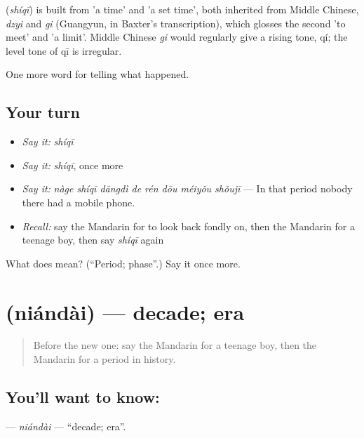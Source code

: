 \begin{cousinweb}
\textbf{} (\emph{shíqī}) is built from  'a time' and  'a set time', both inherited from Middle Chinese, \emph{dzyi} and \emph{gi} (Guangyun, in Baxter's transcription), which glosses the second 'to meet' and 'a limit'. Middle Chinese \emph{gi} would regularly give a rising tone, qí; the level tone of qī is irregular.
\end{cousinweb}

\begin{grammarlens}[title={What you've built}]
One more word for telling what happened.
\end{grammarlens}

\subsection*{Your turn}
\begin{itemize}
\raggedright
  \item \emph{Say it:} \emph{shíqī}
  \item \emph{Say it:} \emph{shíqī}, once more
  \item \emph{Say it:} \emph{nàge shíqī dāngdì de rén dōu méiyǒu shǒujī} — In that period nobody there had a mobile phone.
  \item \emph{Recall:} say the Mandarin for to look back fondly on, then the Mandarin for a teenage boy, then say \emph{shíqī} again
\end{itemize}

\begin{tcolorbox}[breakable,colback=teal!4,colframe=teal!35!black,title={Before you move on}]
What does  mean? (\textquotedblleft{}Period; phase\textquotedblright{}.) Say it once more.
\end{tcolorbox}
\section[\texorpdfstring{\zh{年代} (niándài)}{年代 (niándài)}]{ (niándài) — decade; era}

\label{lesson:ZH-C323-niandai}



\begin{quote}
Before the new one: say the Mandarin for a teenage boy, then the Mandarin for a period in history.
\end{quote}

\subsection*{You'll want to know: }
\textbf{} — \emph{niándài} — \textquotedblleft{}decade; era\textquotedblright{}.

